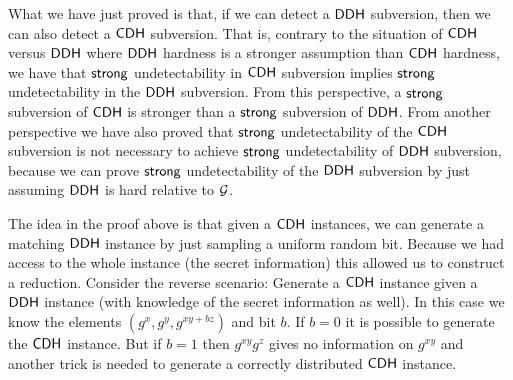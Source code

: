 What we have just proved is that, if we can detect a $\mathsf{DDH}$ subversion, then we can also detect a $\mathsf{CDH}$ subversion. That is, contrary to the situation of $\mathsf{CDH}$ versus $\mathsf{DDH}$ where $\mathsf{DDH}$ hardness is a stronger assumption than $\mathsf{CDH}$ hardness, we have that $\mathsf{strong}$ undetectability in $\mathsf{CDH}$ subversion implies $\mathsf{strong}$ undetectability in the $\mathsf{DDH}$ subversion. From this perspective, a $\mathsf{strong}$ subversion of $\mathsf{CDH}$ is stronger than a $\mathsf{strong}$ subversion of $\mathsf{DDH}$. From another perspective we have also proved that $\mathsf{strong}$ undetectability of the $\mathsf{CDH}$ subversion is not necessary to achieve $\mathsf{strong}$ undetectability of $\mathsf{DDH}$ subversion, because we can prove $\mathsf{strong}$ undetectability of the $\mathsf{DDH}$ subversion by just assuming $\mathsf{DDH}$ is hard relative to $\operatorname{\mathcal{G}}$. 

\begin{rem}
The idea in the proof above is that given a $\mathsf{CDH}$ instances, we can generate a matching $\mathsf{DDH}$ instance by just sampling a uniform random bit. Because we had access to the whole instance (the secret information) this allowed us to construct a reduction. Consider the reverse scenario: Generate a $\mathsf{CDH}$ instance given a $\mathsf{DDH}$ instance (with knowledge of the secret information as well). In this case we know the elements $(g^x,g^y,g^{xy+bz})$ and bit $b$. If $b=0$ it is possible to generate the $\mathsf{CDH}$ instance. But if $b=1$ then $g^{xy}g^z$ gives no information on $g^{xy}$ and another trick is needed to generate a correctly distributed $\mathsf{CDH}$ instance. 
\end{rem}

